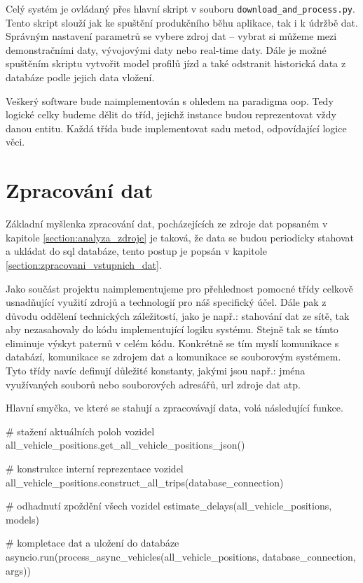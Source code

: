\bigbreak


Celý systém je ovládaný přes hlavní skript v souboru \verb-download_and_process.py-. Tento skript slouží jak ke spuštění produkčního běhu aplikace, tak i k údržbě dat. Správným nastavení parametrů se vybere zdroj dat – vybrat si můžeme mezi demonstračními daty, vývojovými daty nebo real-time daty. Dále je možné spuštěním skriptu vytvořit model profilů jízd a také odstranit historická data z databáze podle jejich data vložení.


\bigbreak


Veškerý software bude naimplementován s ohledem na paradigma \gls{oop}. Tedy logické celky budeme dělit do tříd, jejichž instance budou reprezentovat vždy danou entitu. Každá třída bude implementovat sadu metod, odpovídající logice věci.


\section{Zpracování dat} \label{section:zpracovani_dat}


Základní myšlenka zpracování dat, pocházejících ze zdroje dat popsaném v kapitole \ref{section:analyza_zdroje} je taková, že data se budou periodicky stahovat a ukládat do \gls{sql} databáze, tento postup je popsán v kapitole \ref{section:zpracovani_vstupnich_dat}.


\bigbreak


Jako součást projektu naimplementujeme pro přehlednost pomocné třídy celkově usnadňující využití zdrojů a technologií pro náš specifický účel. Dále pak z důvodu oddělení technických záležitostí, jako je např.: stahování dat ze sítě, tak aby nezasahovaly do kódu implementující logiku systému. Stejně tak se tímto eliminuje výskyt paternů v celém kódu. Konkrétně se tím myslí komunikace s databází, komunikace se zdrojem dat a komunikace se souborovým systémem. Tyto třídy navíc definují důležité konstanty, jakými jsou např.: jména využívaných souborů nebo souborových adresářů, \gls{url} zdroje dat atp.


\bigbreak


Hlavní smyčka, ve které se stahují a zpracovávají data, volá následující funkce.


\begin{code}[frame=none]
# stažení aktuálních poloh vozidel
all_vehicle_positions.get_all_vehicle_positions_json()


# konstrukce interní reprezentace vozidel
all_vehicle_positions.construct_all_trips(database_connection)


# odhadnutí zpoždění všech vozidel
estimate_delays(all_vehicle_positions, models)


# kompletace dat a uložení do databáze
asyncio.run(process_async_vehicles(all_vehicle_positions, database_connection, args))
\end{code}


